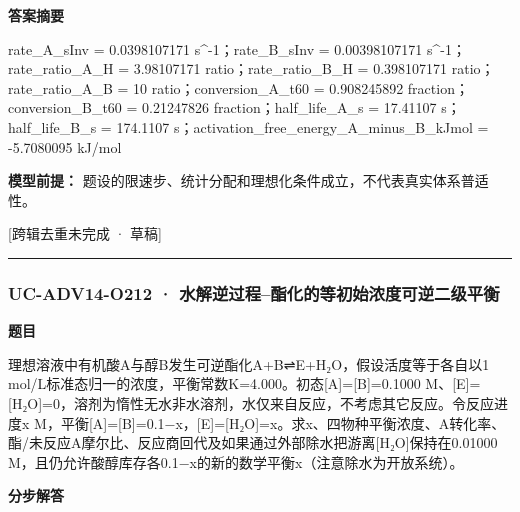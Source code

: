 \documentclass[UTF8,11pt,a4paper]{ctexart}
\begin{document}
\noindent\textbf{答案摘要}\par
rate\_A\_sInv = 0.0398107171 s\textasciicircum{}-1；rate\_B\_sInv = 0.00398107171 s\textasciicircum{}-1；rate\_ratio\_A\_H = 3.98107171 ratio；rate\_ratio\_B\_H = 0.398107171 ratio；rate\_ratio\_A\_B = 10 ratio；conversion\_A\_t60 = 0.908245892 fraction；conversion\_B\_t60 = 0.21247826 fraction；half\_life\_A\_s = 17.41107 s；half\_life\_B\_s = 174.1107 s；activation\_free\_energy\_A\_minus\_B\_kJmol = -5.7080095 kJ/mol\par
\noindent\textbf{模型前提：}
题设的限速步、统计分配和理想化条件成立，不代表真实体系普适性。\par
\noindent\textcolor{red!65!black}{[跨辑去重未完成 · 草稿]} \par
\medskip\hrule\medskip
{}
\subsubsection*{UC-ADV14-O212 · 水解逆过程–酯化的等初始浓度可逆二级平衡}
\noindent\textbf{题目}\par
理想溶液中有机酸A与醇B发生可逆酯化A+B⇌E+H₂O，假设活度等于各自以1 mol/L标准态归一的浓度，平衡常数K=4.000。初态[A]=[B]=0.1000 M、[E]=[H₂O]=0，溶剂为惰性无水非水溶剂，水仅来自反应，不考虑其它反应。令反应进度x M，平衡[A]=[B]=0.1−x，[E]=[H₂O]=x。求x、四物种平衡浓度、A转化率、酯/未反应A摩尔比、反应商回代及如果通过外部除水把游离[H₂O]保持在0.01000 M，且仍允许酸醇库存各0.1−x的新的数学平衡x（注意除水为开放系统）。\par
\medskip\noindent\textbf{分步解答}
\end{document}
